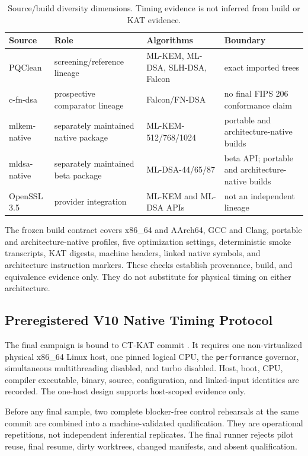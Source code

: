 \documentclass[cryptography,article,submit,moreauthors]{Definitions/mdpi}
\begin{document}
\begin{table}[H]
\caption{Source/build diversity dimensions. Timing evidence is not inferred from build or KAT evidence.\label{tab:lineages}}
\begin{tabularx}{\textwidth}{LLLL}
\toprule
\textbf{Source} & \textbf{Role} & \textbf{Algorithms} & \textbf{Boundary}\\
\midrule
PQClean & screening/reference lineage & ML-KEM, ML-DSA, SLH-DSA, Falcon & exact imported trees\\
c-fn-dsa & prospective comparator lineage & Falcon/FN-DSA & no final FIPS 206 conformance claim\\
mlkem-native & separately maintained native package & ML-KEM-512/768/1024 & portable and architecture-native builds\\
mldsa-native & separately maintained beta package & ML-DSA-44/65/87 & beta API; portable and architecture-native builds\\
OpenSSL 3.5 & provider integration & ML-KEM and ML-DSA APIs & not an independent lineage\\
\bottomrule
\end{tabularx}
\end{table}

The frozen build contract covers x86\_64 and AArch64, GCC and Clang, portable
and architecture-native profiles, five optimization settings, deterministic
smoke transcripts, KAT digests, machine headers, linked native symbols, and
architecture instruction markers. These checks establish provenance, build,
and equivalence evidence only. They do not substitute for physical timing on
either architecture.

\subsection{Preregistered V10 Native Timing Protocol}
\label{sec:timing-protocol}

The final campaign is bound to CT-KAT commit
\texttt{}. It requires one
non-virtualized physical x86\_64 Linux host, one pinned logical CPU, the
\texttt{performance} governor, simultaneous multithreading disabled, and turbo
disabled. Host, boot, CPU, compiler executable, binary, source, configuration,
and linked-input identities are recorded. The one-host design supports
host-scoped evidence only.

Before any final sample, two complete blocker-free control rehearsals at the
same commit are combined into a machine-validated qualification. They are
operational repetitions, not independent inferential replicates. The final
runner rejects pilot reuse, final resume, dirty worktrees, changed manifests,
and absent qualification.
\end{document}
